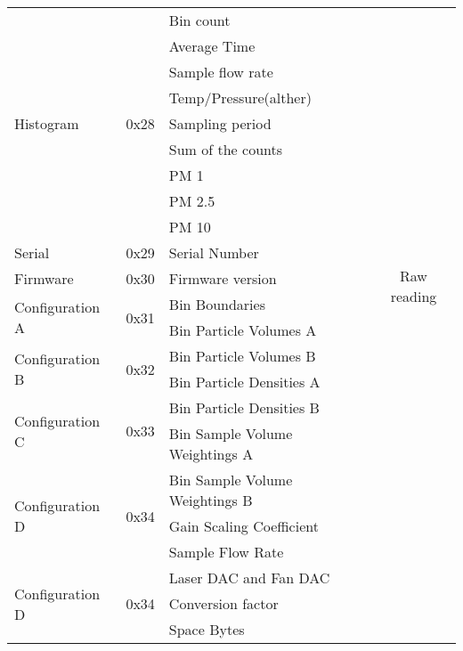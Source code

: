 \begin{center}
\begin{longtable}{|l|c|>{\centering}p{}|c|}
     \rowcolor{black!8} \multicolumn{4}{|c|}{{Alpha Sensor}} \\ \hline
        \multirow{9}{*}{Histogram} & \multirow{9}{*}{0x28} & Bin count & \multirow{20}{*}{Raw reading} \\ \cline{3-3}
        & & Average Time &\\ \cline{3-3}
        & & Sample flow rate &\\ \cline{3-3}
        & & Temp/Pressure(alther) &\\ \cline{3-3}
        & & Sampling period &\\ \cline{3-3}
        & & Sum of the counts &\\ \cline{3-3}
        & & PM 1 &\\ \cline{3-3}
        & & PM 2.5 &\\ \cline{3-3}
        & & PM 10 &\\ \cline{1-3}
        Serial & 0x29 & Serial Number & \\ \cline{1-3}
        Firmware & 0x30 & Firmware version & \\ \cline{1-3}
        \multirow{2}{*}{Configuration A} & \multirow{2}{*}{0x31} & Bin Boundaries &\\ \cline{3-3}
        & & Bin Particle Volumes A &\\ \cline{1-3}
        \multirow{2}{*}{Configuration B} & \multirow{2}{*}{0x32} & Bin Particle Volumes B &\\ \cline{3-3}
        & & Bin Particle Densities A &\\ \cline{1-3}
        \multirow{2}{*}{Configuration C} & \multirow{2}{*}{0x33} & Bin Particle Densities B &\\ \cline{3-3}
        & & Bin Sample Volume Weightings A &\\ \cline{1-3}
        \multirow{3}{*}{Configuration D} & \multirow{3}{*}{0x34} & Bin Sample Volume Weightings B &\\ \cline{3-3}
        & & Gain Scaling Coefficient & \\ \cline{3-3}
        & & Sample Flow Rate & \\
        \multirow{3}{*}{Configuration D} & \multirow{3}{*}{0x34} & Laser DAC and Fan DAC & \\ \cline{3-3}
        & & Conversion factor & \\ \cline{3-3}
        & & Space Bytes & \\ 

\end{longtable}
\end{center}